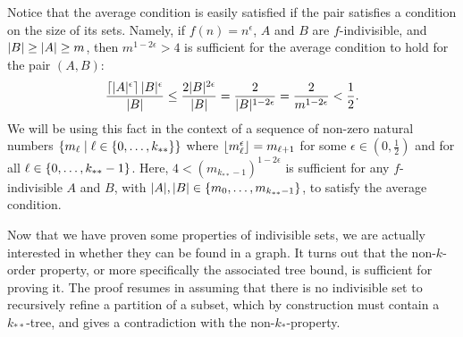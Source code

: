         \begin{remark} \label{rmk:sufficient_requirement_for_average_condition}
            Notice that the average condition is easily satisfied if the pair satisfies a condition on the size of its sets.
            Namely, if $f(n) = n^\epsilon$, $A$ and $B$ are $f$-indivisible, and $| B | \geq | A | \geq m$,
            then $m^{1-2\epsilon} > 4$ is sufficient for the average condition to hold for the pair $(A,B)$:
            \[
                \frac{\left\lceil |A|^\epsilon \right\rceil |B|^\epsilon}{|B|}
                    \leq \frac{2|B|^{2\epsilon}}{|B|}
                    = \frac{2}{|B|^{1-2\epsilon}}
                    = \frac{2}{m^{1-2\epsilon}}
                    < \frac{1}{2}.
            \]
            We will be using this fact in the context of a sequence of non-zero natural numbers
            $\{ m_\ell \mid \ell \in \{ 0, \dots, k_{**} \} \}$ where $\left\lfloor m_\ell^\epsilon \right\rfloor = m_{\ell+1}$
            for some $\epsilon \in (0, \frac{1}{2})$ and for all $\ell \in \{ 0, \dots, k_{**}-1 \}$.
            Here, $4 < (m_{k_{**}-1})^{1-2\epsilon}$ is sufficient for any $f$-indivisible $A$ and $B$, with
            $|A|, |B| \in \{ m_0, \dots, m_{k_{**}-1} \}$, to satisfy the average condition.
        \end{remark}

        Now that we have proven some properties of indivisible sets, we are actually interested in whether they can be
        found in a graph.
        It turns out that the non-$k$-order property, or more specifically the associated tree bound, is sufficient for
        proving it.
        The proof resumes in assuming that there is no indivisible set to recursively refine a partition of a subset,
        which by construction must contain a $k_{**}$-tree, and gives a contradiction with the non-$k_*$-property.

